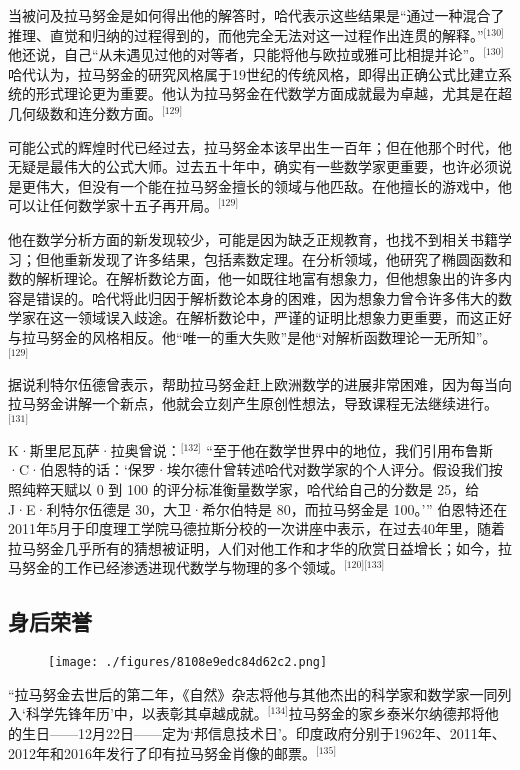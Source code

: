 当被问及拉马努金是如何得出他的解答时，哈代表示这些结果是“通过一种混合了推理、直觉和归纳的过程得到的，而他完全无法对这一过程作出连贯的解释。”\(^\text{[130]}\)他还说，自己“从未遇见过他的对等者，只能将他与欧拉或雅可比相提并论”。\(^\text{[130]}\)哈代认为，拉马努金的研究风格属于19世纪的传统风格，即得出正确公式比建立系统的形式理论更为重要。他认为拉马努金在代数学方面成就最为卓越，尤其是在超几何级数和连分数方面。\(^\text{[129]}\)

可能公式的辉煌时代已经过去，拉马努金本该早出生一百年；但在他那个时代，他无疑是最伟大的公式大师。过去五十年中，确实有一些数学家更重要，也许必须说是更伟大，但没有一个能在拉马努金擅长的领域与他匹敌。在他擅长的游戏中，他可以让任何数学家十五子再开局。\(^\text{[129]}\)

他在数学分析方面的新发现较少，可能是因为缺乏正规教育，也找不到相关书籍学习；但他重新发现了许多结果，包括素数定理。在分析领域，他研究了椭圆函数和数的解析理论。在解析数论方面，他一如既往地富有想象力，但他想象出的许多内容是错误的。哈代将此归因于解析数论本身的困难，因为想象力曾令许多伟大的数学家在这一领域误入歧途。在解析数论中，严谨的证明比想象力更重要，而这正好与拉马努金的风格相反。他“唯一的重大失败”是他“对解析函数理论一无所知”。\(^\text{[129]}\)

据说利特尔伍德曾表示，帮助拉马努金赶上欧洲数学的进展非常困难，因为每当向拉马努金讲解一个新点，他就会立刻产生原创性想法，导致课程无法继续进行。\(^\text{[131]}\)

K·斯里尼瓦萨·拉奥曾说：\(^\text{[132]}\) “至于他在数学世界中的地位，我们引用布鲁斯·C·伯恩特的话：‘保罗·埃尔德什曾转述哈代对数学家的个人评分。假设我们按照纯粹天赋以 0 到 100 的评分标准衡量数学家，哈代给自己的分数是 25，给J·E·利特尔伍德是 30，大卫·希尔伯特是 80，而拉马努金是 100。’” 伯恩特还在2011年5月于印度理工学院马德拉斯分校的一次讲座中表示，在过去40年里，随着拉马努金几乎所有的猜想被证明，人们对他工作和才华的欣赏日益增长；如今，拉马努金的工作已经渗透进现代数学与物理的多个领域。\(^\text{[120][133]}\)
\subsection{身后荣誉}
\begin{figure}[ht]
\centering
\texttt{[image: ./figures/8108e9edc84d62c2.png]}
\caption{} \label{fig_LMLJ_8}
\end{figure}
“拉马努金去世后的第二年，《自然》杂志将他与其他杰出的科学家和数学家一同列入‘科学先锋年历’中，以表彰其卓越成就。\(^\text{[134]}\)拉马努金的家乡泰米尔纳德邦将他的生日——12月22日——定为‘邦信息技术日’。印度政府分别于1962年、2011年、2012年和2016年发行了印有拉马努金肖像的邮票。\(^\text{[135]}\)

